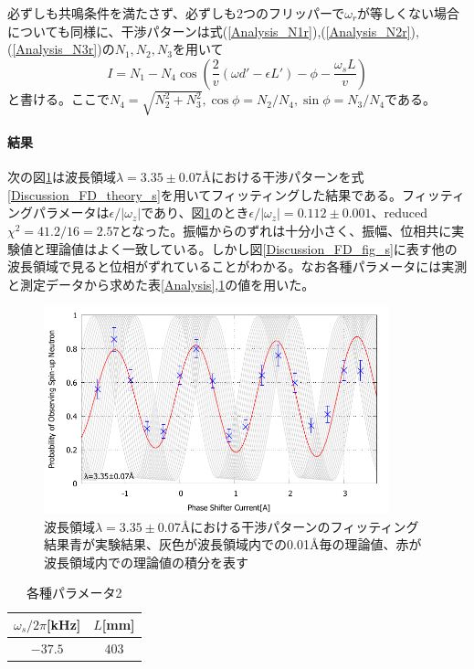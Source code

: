 必ずしも共鳴条件を満たさず、必ずしも2つのフリッパーで$\omega_r$が等しくない場合についても同様に、干渉パターンは式(\ref{Analysis_N1r}),(\ref{Analysis_N2r}),(\ref{Analysis_N3r})の$N_1,N_2,N_3$を用いて
\begin{equation}
I=N_1-N_4\cos\left(\frac{2}{v} (\omega d' -\epsilon L') -\phi -\frac{\omega_s L}{v} \right)\label{Discussion_FD_theory_s}
\end{equation}
と書ける。ここで$N_4=\sqrt{N_2^2+N_3^2},\cos\phi=N_2/N_4,\sin\phi=N_3/N_4$である。

\paragraph{結果}
次の図\ref{Discussion_FD_fig_s_470}は波長領域$\lambda=3.35\pm0.07$\AA における干渉パターンを式\ref{Discussion_FD_theory_s}を用いてフィッティングした結果である。フィッティングパラメータは$\epsilon/|\omega_z|$であり、図\ref{Discussion_FD_fig_s_470}のとき$\epsilon/|\omega_z|=0.112\pm0.001$、reduced$\chi^2=41.2/16=2.57$となった。振幅からのずれは十分小さく、振幅、位相共に実験値と理論値はよく一致している。しかし図\ref{Discussion_FD_fig_s}に表す他の波長領域で見ると位相がずれていることがわかる。なお各種パラメータには実測と測定データから求めた表\ref{Analysis},\ref{Discussion_FD_tbl_parameter}の値を用いた。
\begin{figure}[h]
\centering
\includegraphics[width=10cm]{discussion/FD/IT_s_470.pdf}
\caption{波長領域$\lambda=3.35\pm0.07$\AA における干渉パターンのフィッティング結果\newline 青が実験結果、灰色が波長領域内での0.01\AA 毎の理論値、赤が波長領域内での理論値の積分を表す}\label{Discussion_FD_fig_s_470}
\end{figure}

\begin{table}[h]
\centering
\caption{各種パラメータ2}\label{Discussion_FD_tbl_parameter}
\begin{tabular}{cc}
$\omega_s/2\pi$[kHz]&$L$[mm]\\ \hline
$-37.5$&$403$
\end{tabular}
\end{table}

